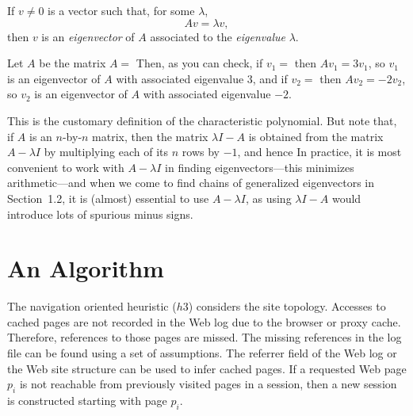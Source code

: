 \documentclass{book}\usepackage[]{graphicx}\usepackage[]{color}
\begin{document}
\begin{definition}
\label{ch02.def1}
If \(v \neq 0\) is a vector such that, for some
$\lambda$,
\[
A v = \lambda v,
\]
then $v$ is an \textit{eigenvector} of $A$ associated
%
to the \textit{eigenvalue} $\lambda$.
%
\end{definition}

\begin{example}
\label{ch02.ex1}
Let $A$ be the matrix $A =$
Then, as you can check, if $v_1 =$ 
then $A v_1 = 3 v_1$, so $v_1$ is an eigenvector of $A$ with associated
eigenvalue $3$, and if $v_2 =$ 
then $A v_2 = -2 v_2$, so $v_2$ is
an eigenvector of $A$ with associated eigenvalue $-2$.
\end{example}

\begin{remark}
\label{ch02.rem1}
This is the customary definition of the characteristic
%
polynomial.
But note that, if $A$ is an $n$-by-$n$ matrix, then the matrix
$\lambda I - A$ is obtained from the matrix $A - \lambda I$ by multiplying
each of its $n$ rows by $-1$, and hence
In practice, it is most convenient
to work with $A -\lambda I$ in finding eigenvectors---this minimizes
arithmetic---and when we come to find
chains of generalized eigenvectors in
Section~1.2,
it is (almost) essential to use $A -\lambda I$, as using
$\lambda I - A$ would introduce lots of spurious minus signs.
\end{remark}

\clearpage

    


\chapter{An Algorithm}
\label{ch03}

The navigation oriented heuristic ($h3$) considers the site topology.
Accesses to cached pages are not recorded in the
Web log due to the browser or proxy cache.
Therefore, references to those pages are missed.
The missing references in the log file can be found using a set of
assumptions.
The referrer field of the Web log or the Web site structure can be used
to infer cached pages.
If a requested Web page $p_i$ is not reachable
from previously visited pages in a
session, then a new session is constructed starting with page $p_i$.
\end{document}
